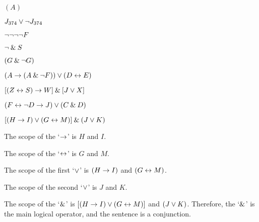 \problempart
\label{pr.wiffTFL}
\begin{earg}
\item $(A)$\hfill {}
\medskip

\item $J_{374} \vee {\neg} J_{374}$ \hfill {}
\medskip

\item ${\neg} {\neg} {\neg} {\neg} F$ \hfill {}
\medskip

\item ${\neg} \mathbin{\&} S$\hfill {}
\medskip

\item $(G \mathbin{\&} {\neg} G)$\hfill {}
\medskip

\item $(A \rightarrow (A \mathbin{\&} {\neg} F)) \vee (D \leftrightarrow E)$\hfill {}
\medskip

\item $[(Z \leftrightarrow S) \rightarrow W] \mathbin{\&} [J \vee X]$\hfill {}
\medskip

\item $(F \leftrightarrow {\neg} D \rightarrow J) \vee (C \mathbin{\&} D)$\hfill {}
\medskip
\end{earg}



\problempart $[(H \rightarrow I) \vee (G \leftrightarrow M)] \mathbin{\&} (J \vee K)$
\medskip

\noindent The scope of the `$\rightarrow$' is $H$ and $I$. 

\noindent The scope of the `$\leftrightarrow$' is $G$ and $M$. 

\noindent The scope of the first `$\vee$' is $(H \rightarrow I)$ and $(G \leftrightarrow M)$.

\noindent The scope of the second `$\vee$' is $J$ and $K$.

\noindent\hangindent=3mm The scope of the `$\mathbin{\&}$' is $[(H \rightarrow I) \vee (G \leftrightarrow M)]$ and $(J \vee K)$. Therefore, the `$\mathbin{\&}$' is the main logical operator, and the sentence is a conjunction.


